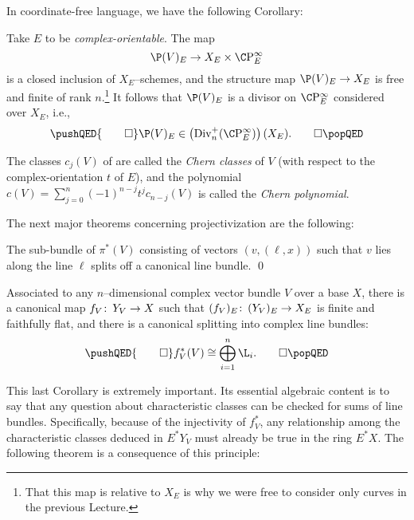 In coordinate-free language, we have the following Corollary:
\begin{corollary}
Take \(E\) to be \emph{complex-orientable}.  The map \[\P(V)_E \to X_E \times \CP^\infty_E\] is a closed inclusion of \(X_E\)--schemes, and the structure map \(\P(V)_E \to X_E\) is free and finite of rank \(n\).\footnote{That this map is relative to $X_E$ is why we were free to consider only curves in the previous Lecture.}  It follows that \(\P(V)_E\) is a divisor on \(\CP^\infty_E\) considered over \(X_E\), i.e.,
\[\pushQED{\qed}
\P(V)_E \in \left(\Div_n^+(\CP^\infty_E)\right)(X_E). \qedhere
\popQED\]
\end{corollary}

\begin{definition}
The classes \(c_j(V)\) of  are called the \textit{Chern classes} of \(V\) (with respect to the complex-orientation \(t\) of \(E\)), and the polynomial \(c(V) = \sum_{j=0}^n (-1)^{n-j} t^j c_{n-j}(V)\) is called the \textit{Chern polynomial}.
\end{definition}

The next major theorems concerning projectivization are the following:

\begin{corollary}
The sub-bundle of \(\pi^*(V)\) consisting of vectors \((v, (\ell, x))\) such that \(v\) lies along the line \(\ell\) splits off a canonical line bundle. \qed
\end{corollary}

\begin{corollary}\label{OriginalSplittingPrinciple}
Associated to any \(n\)--dimensional complex vector bundle \(V\) over a base \(X\), there is a canonical map \(f_V\colon\thinspace Y_V \to X\) such that \((f_V)_E\colon\thinspace (Y_V)_E \to X_E\) is finite and faithfully flat, and there is a canonical splitting into complex line bundles:
\[\pushQED{\qed}
f_V^*(V) \cong \bigoplus_{i=1}^n \L_i. \qedhere
\popQED\]
\end{corollary}

This last Corollary is extremely important.  Its essential algebraic content is to say that any question about characteristic classes can be checked for sums of line bundles.  Specifically, because of the injectivity of \(f_V^*\), any relationship among the characteristic classes deduced in \(E^* Y_V\) must already be true in the ring \(E^* X\).  The following theorem is a consequence of this principle:

